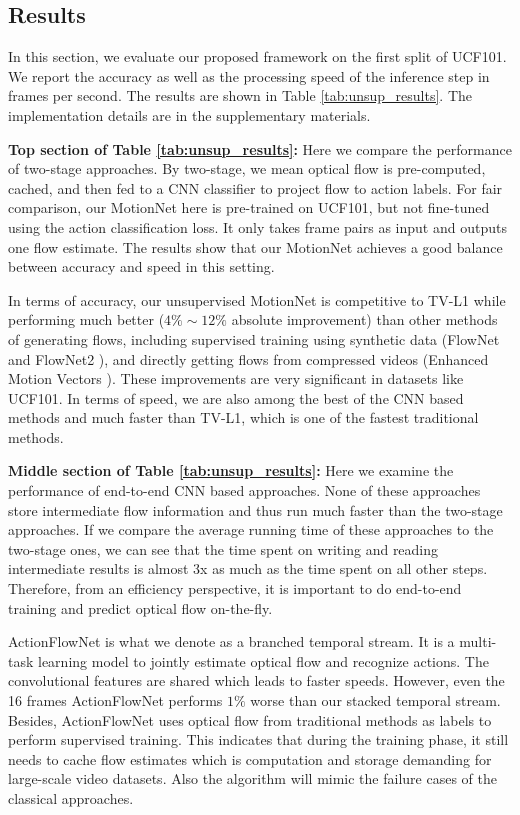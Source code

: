 \documentclass[runningheads]{llncs}
\begin{document}
		\subsection{Results}
		\label{sec:results}
		In this section, we evaluate our proposed framework on the first split of UCF101. We report the accuracy as well as the processing speed of the inference step in frames per second. The results are shown in Table \ref{tab:unsup_results}. The implementation details are in the supplementary materials.
		
		\noindent \textbf{Top section of Table \ref{tab:unsup_results}:} Here we compare the performance of two-stage approaches. {\color{black}By two-stage, we mean optical flow is pre-computed, cached, and then fed to a CNN classifier to project flow to action labels. For fair comparison, our MotionNet here is pre-trained on UCF101, but not fine-tuned using the action classification loss. It only takes frame pairs as input and outputs one flow estimate.}
		The results show that our MotionNet achieves a good balance between accuracy and speed in this setting. 
		
		In terms of accuracy, our unsupervised MotionNet is competitive to TV-L1 while performing much better ($4\% \sim 12\%$ absolute improvement) than other methods of generating flows, including supervised training using synthetic data (FlowNet \cite{flownet} and FlowNet2 \cite{flownet2}), and directly getting flows from compressed videos (Enhanced Motion Vectors \cite{EMV_cvpr16}). These improvements are very significant in datasets like UCF101. 
		In terms of speed, we are also among the best of the CNN based methods and much faster than TV-L1, which is one of the fastest traditional methods.   
		


		\noindent  \textbf{Middle section of Table \ref{tab:unsup_results}:} Here we examine the performance of end-to-end CNN based approaches. None of these approaches store intermediate flow information and thus run much faster than the two-stage approaches. If we compare the average running time of these approaches to the two-stage ones, we can see that the time spent on writing and reading intermediate results is almost 3x as much as the time spent on all other steps. Therefore, from an efficiency perspective, it is important to do end-to-end training and predict optical flow on-the-fly. 
		
		ActionFlowNet \cite{actionflownet_16} is what we denote as a branched temporal stream. It is a multi-task learning model to jointly estimate optical flow and recognize actions. The convolutional features are shared which leads to faster speeds. However, even the 16 frames ActionFlowNet performs $1\%$ worse than our stacked temporal stream. Besides, ActionFlowNet uses optical flow from traditional methods as labels to perform supervised training. This indicates that during the training phase, it still needs to cache flow estimates which is computation and storage demanding for large-scale video datasets. Also the algorithm will mimic the failure cases of the classical approaches. 
		
\end{document}
